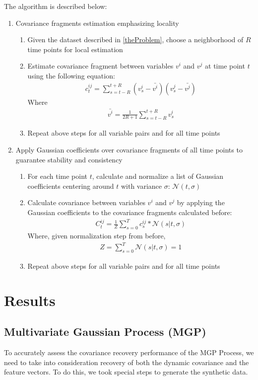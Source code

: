 \documentclass[12pt]{article}
\begin{document}
The algorithm is described below:
\begin{enumerate}
\item Covariance fragments estimation emphasizing locality
\begin{enumerate}
\item Given the dataset described in \ref{theProblem}, choose a neighborhood of $R$ time points for local estimation
\item Estimate covariance fragment between variables $v^i$ and $v^j$ at time point $t$ using the following equation:
\begin{align}
c_t^{ij} = \sum_{s = t-R}^{t+R} (v^i_s - \bar{v^i})(v^j_s-\bar{v^j})
\end{align}
Where
\begin{align}
\bar{v^i} = \frac{1}{2R+1}\sum_{s = t-R}^{t+R} v^i_s
\end{align}
\item Repeat above steps for all variable pairs and for all time points
\end{enumerate}
\item Apply Gaussian coefficients over covariance fragments of all time points to guarantee stability and consistency
\begin{enumerate}
\item For each time point $t$, calculate and normalize a list of Gaussian coefficients centering around $t$ with variance $\sigma$: $\mathcal{N}(t,\sigma)$
\item Calculate covariance between variables $v^i$ and $v^j$ by applying the Gaussian coefficients to the covariance fragments calculated before:
\begin{align}
C^{ij}_t = \frac{1}{Z}\sum_{s=0}^T c^{ij}_s * \mathcal{N}(s|t,\sigma)
\end{align}
Where, given normalization step from before,
\begin{align}
Z = \sum_{s=0}^T \mathcal{N}(s|t,\sigma) = 1
\end{align}
\item Repeat above steps for all variable pairs and for all time points
\end{enumerate}
\end{enumerate}

\section{Results}
\subsection{Multivariate Gaussian Process (MGP)}
To accurately assess the covariance recovery performance of the MGP Process, we need to take into consideration recovery of both the dynamic covariance and the feature vectors. To do this, we took special steps to generate the synthetic data.\par
\end{document}
